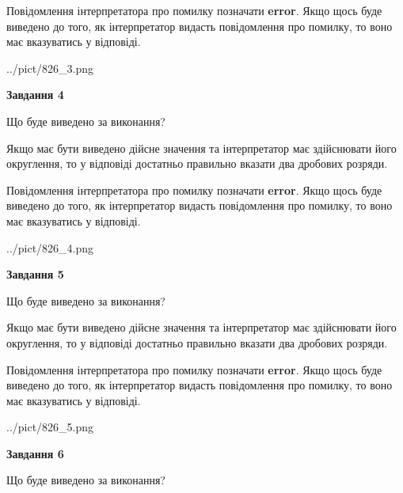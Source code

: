 \documentclass[12pt, ukrainian]{article}
\begin{document}
{\begin {Large}
Повідомлення інтерпретатора про помилку позначати \textbf{error}.
Якщо щось буде виведено до того, як інтерпретатор видасть повідомлення про помилку, 
то воно має вказуватись у відповіді. \par

\begin{center}
	{../pict/826_3.png}
\end{center}
\newpage

{\begin {center}\textbf{Завдання 4}\end {center}}\par
Що буде виведено за виконання? \par

Якщо має бути виведено дійсне значення та інтерпретатор має здійснювати його округлення, 
то у відповіді достатньо правильно вказати два дробових розряди.

Повідомлення інтерпретатора про помилку позначати \textbf{error}.
Якщо щось буде виведено до того, як інтерпретатор видасть повідомлення про помилку, 
то воно має вказуватись у відповіді. \par

\begin{center}
	{../pict/826_4.png}
\end{center}
\newpage

{\begin {center}\textbf{Завдання 5}\end {center}}\par
Що буде виведено за виконання? \par

Якщо має бути виведено дійсне значення та інтерпретатор має здійснювати його округлення, 
то у відповіді достатньо правильно вказати два дробових розряди.

Повідомлення інтерпретатора про помилку позначати \textbf{error}.
Якщо щось буде виведено до того, як інтерпретатор видасть повідомлення про помилку, 
то воно має вказуватись у відповіді. \par

\begin{center}
	{../pict/826_5.png}
\end{center}
\newpage

{\begin {center}\textbf{Завдання 6}\end {center}}\par
Що буде виведено за виконання? \par


\end{Large}}
\end{document}
